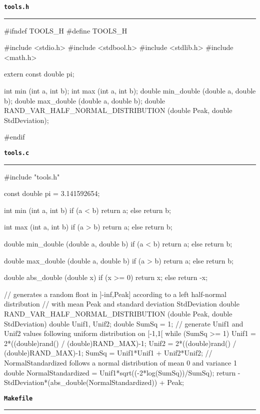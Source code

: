 \vspace*{5mm}
{\Large \texttt{\textbf{tools.h}}}
\vspace*{1mm}
\hrule
\begin{C}
#ifndef TOOLS_H
#define TOOLS_H

#include <stdio.h>
#include <stdbool.h>
#include <stdlib.h>
#include <math.h>

extern const double pi;

int min (int a, int b);
int max (int a, int b);
double min_double (double a, double b);
double max_double (double a, double b);
double RAND_VAR_HALF_NORMAL_DISTRIBUTION (double Peak, double StdDeviation);

#endif
\end{C}
\vspace*{5mm}
{\Large \texttt{\textbf{tools.c}}}
\vspace*{1mm}
\hrule
\begin{C}
#include "tools.h"


const double pi = 3.141592654;


int min (int a, int b){
	if (a < b) return a;
	else return b;
}

int max (int a, int b){
	if (a > b) return a;
	else return b;
}

double min_double (double a, double b){
	if (a < b) return a;
	else return b;
}

double max_double (double a, double b){
	if (a > b) return a;
	else return b;
}

double abs_double (double x){
	if (x >= 0) return x;
	else return -x;
}

// generates a random float in ]-inf,Peak] according to a left half-normal distribution
// with mean Peak and standard deviation StdDeviation
double RAND_VAR_HALF_NORMAL_DISTRIBUTION (double Peak, double StdDeviation){
	double Unif1, Unif2;
	double SumSq = 1;
	// generate Unif1 and Unif2 values following uniform distribution on [-1,1[
	while (SumSq >= 1){
		Unif1 = 2*((double)rand() / (double)RAND_MAX)-1;
		Unif2 = 2*((double)rand() / (double)RAND_MAX)-1;
		SumSq = Unif1*Unif1 + Unif2*Unif2;
	}
	// NormalStandardized follows a normal distribution of mean 0 and variance 1
	double NormalStandardized = Unif1*sqrt((-2*log(SumSq))/SumSq);
	return -StdDeviation*(abs_double(NormalStandardized)) + Peak;
}
\end{C}
\vspace*{5mm}
{\Large \texttt{\textbf{Makefile}}}
\vspace*{1mm}
\hrule
